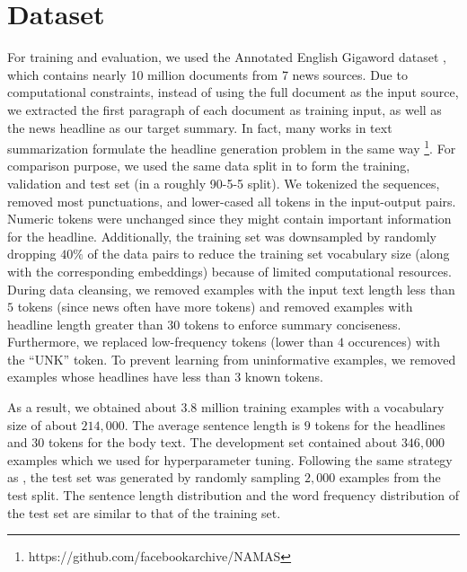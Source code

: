 \section{Dataset}
\label{sec: dataset}

For training and evaluation, we used the Annotated English Gigaword dataset \cite{graff2003english}, which contains nearly 10 million documents from 7 news sources. Due to computational constraints, instead of using the full document as the input source, we extracted the first paragraph of each document as training input, as well as the news headline as our target summary. In fact, many works in text summarization formulate the headline generation problem in the same way \cite{rush2015neural} \footnote{https://github.com/facebookarchive/NAMAS}. For comparison purpose, we used the same data split in \cite{rush2015neural} to form the training, validation and test set (in a roughly 90-5-5 split). We tokenized the sequences, removed most punctuations, and lower-cased all tokens in the input-output pairs. Numeric tokens were unchanged since they might contain important information for the headline. Additionally, the training set was downsampled by randomly dropping $40\%$ of the data pairs to reduce the training set vocabulary size (along with the corresponding embeddings) because of limited computational resources. During data cleansing, we removed examples with the input text length less than $5$ tokens (since news often have more tokens) and removed examples with headline length greater than $30$ tokens to enforce summary conciseness. Furthermore, we replaced low-frequency tokens (lower than $4$ occurences) with the ``UNK'' token. To prevent learning from uninformative examples, we removed examples whose headlines have less than $3$ known tokens. 

As a result, we obtained about $3.8$ million training examples with a vocabulary size of about $214,000$. The average sentence length is $9$ tokens for the headlines and $30$ tokens for the body text. The development set contained about $346,000$ examples which we used for hyperparameter tuning. Following the same strategy as \cite{rush2015neural}, the test set was generated by randomly sampling $2,000$ examples from the test split. The sentence length distribution and the word frequency distribution of the test set are similar to that of the training set.
